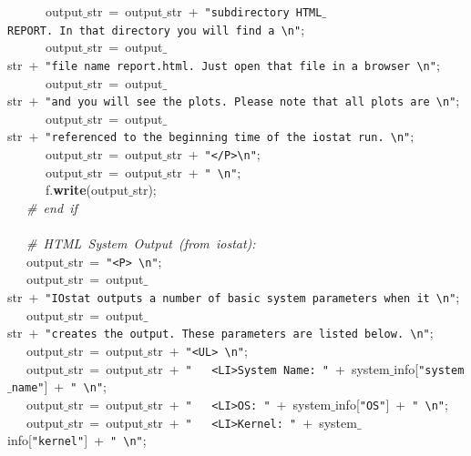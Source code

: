 \mbox{}\ \ \ \ \ \ output$\_$str\ =\ output$\_$str\ +\ \texttt{"{}subdirectory\ HTML$\_$REPORT.\ In\ that\ directory\ you\ will\ find\ a\ \textbackslash{}n"{}}; \\
\mbox{}\ \ \ \ \ \ output$\_$str\ =\ output$\_$str\ +\ \texttt{"{}file\ name\ report.html.\ Just\ open\ that\ file\ in\ a\ browser\ \textbackslash{}n"{}}; \\
\mbox{}\ \ \ \ \ \ output$\_$str\ =\ output$\_$str\ +\ \texttt{"{}and\ you\ will\ see\ the\ plots.\ Please\ note\ that\ all\ plots\ are\ \textbackslash{}n"{}}; \\
\mbox{}\ \ \ \ \ \ output$\_$str\ =\ output$\_$str\ +\ \texttt{"{}referenced\ to\ the\ beginning\ time\ of\ the\ iostat\ run.\ \textbackslash{}n"{}}; \\
\mbox{}\ \ \ \ \ \ output$\_$str\ =\ output$\_$str\ +\ \texttt{"{}\textless{}/P\textgreater{}\textbackslash{}n"{}}; \\
\mbox{}\ \ \ \ \ \ output$\_$str\ =\ output$\_$str\ +\ \texttt{"{}\ \textbackslash{}n"{}}; \\
\mbox{}\ \ \ \ \ \ f.\textbf{write}(output$\_$str); \\
\mbox{}\ \ \ \textit{\#\ end\ if} \\
\mbox{}\ \ \  \\
\mbox{}\ \ \ \textit{\#\ HTML\ System\ Output\ (from\ iostat):} \\
\mbox{}\ \ \ output$\_$str\ =\ \texttt{"{}\textless{}P\textgreater{}\ \textbackslash{}n"{}}; \\
\mbox{}\ \ \ output$\_$str\ =\ output$\_$str\ +\ \texttt{"{}IOstat\ outputs\ a\ number\ of\ basic\ system\ parameters\ when\ it\ \textbackslash{}n"{}}; \\
\mbox{}\ \ \ output$\_$str\ =\ output$\_$str\ +\ \texttt{"{}creates\ the\ output.\ These\ parameters\ are\ listed\ below.\ \textbackslash{}n"{}}; \\
\mbox{}\ \ \ output$\_$str\ =\ output$\_$str\ +\ \texttt{"{}\textless{}UL\textgreater{}\ \textbackslash{}n"{}}; \\
\mbox{}\ \ \ output$\_$str\ =\ output$\_$str\ +\ \texttt{"{}\ \ \ \textless{}LI\textgreater{}System\ Name:\ "{}}\ +\ system$\_$info[\texttt{"{}system$\_$name"{}}]\ +\ \texttt{"{}\ \textbackslash{}n"{}}; \\
\mbox{}\ \ \ output$\_$str\ =\ output$\_$str\ +\ \texttt{"{}\ \ \ \textless{}LI\textgreater{}OS:\ "{}}\ +\ system$\_$info[\texttt{"{}OS"{}}]\ +\ \texttt{"{}\ \textbackslash{}n"{}}; \\
\mbox{}\ \ \ output$\_$str\ =\ output$\_$str\ +\ \texttt{"{}\ \ \ \textless{}LI\textgreater{}Kernel:\ "{}}\ +\ system$\_$info[\texttt{"{}kernel"{}}]\ +\ \texttt{"{}\ \textbackslash{}n"{}}; \\
